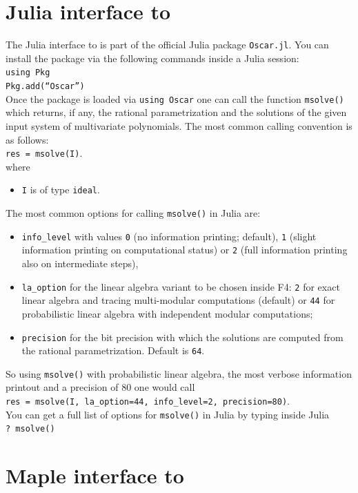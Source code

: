 \documentclass[a4paper,english,11pt]{scrartcl}
\theoremstyle{definition}
\theoremstyle{remark}
\begin{document}
\section{Julia interface to \msolve}
The Julia interface to \msolve is part of the official Julia package
\texttt{Oscar.jl}. You can install the package via the following
commands inside a Julia session:\\[1em]
\texttt{using Pkg\\
Pkg.add(“Oscar”)}\\[1em]
Once the package is loaded via \texttt{using Oscar} one can call the function
\texttt{msolve()} which returns, if any, the rational parametrization and the solutions of the given input
system of multivariate polynomials. The most common calling convention is as follows:\\[1em]
\texttt{res = msolve(I)}.\\[1em]
where
\begin{itemize}
    \item \texttt{I} is of type \texttt{ideal}.
\end{itemize}
The most common options for calling \texttt{msolve()} in Julia are:
\begin{itemize}
    \item \texttt{info\_level} with values \texttt{0} (no information printing;
        default), \texttt{1} (slight information printing on computational
        status) or \texttt{2} (full information printing also on intermediate
        steps),
    \item \texttt{la\_option} for the linear algebra variant to be chosen inside
        F4: \texttt{2} for exact linear algebra and tracing multi-modular
        computations (default) or \texttt{44} for probabilistic linear algebra
        with independent modular computations;
    \item \texttt{precision} for the bit precision with which the solutions are
        computed from the rational parametrization. Default is \texttt{64}.
\end{itemize}
So using \texttt{msolve()} with probabilistic linear algebra, the most verbose
information printout and a precision of $80$ one would call\\[1em]
\texttt{res = msolve(I, la\_option=44, info\_level=2,
precision=80)}.\\[1em]
You can get a full list of options for \texttt{msolve()} in Julia by typing
inside Julia\\[1em]
\texttt{? msolve()}
\section{Maple interface to \msolve}
\end{document}
